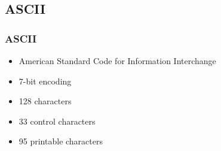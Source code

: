 \subsection{ASCII}

\begin{frame}
    \frametitle{ASCII}
    \begin{itemize}
        \item American Standard Code for Information Interchange
        \item 7-bit encoding
        \item 128 characters
        \item 33 control characters
        \item 95 printable characters
    \end{itemize}
    \note{
    }
\end{frame}


